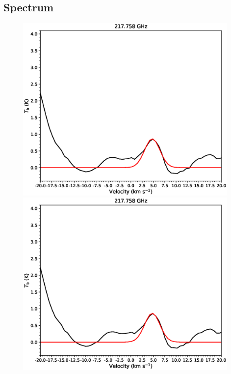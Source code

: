 \subsection{Spectrum}
\begin{figure}[H] 
\begin{center}
\begin{minipage}{0.98\textwidth} 
\begin{center}
\begin{minipage}{0.48\textwidth}
\begin{center}
\includegraphics[width=0.98\textwidth]{OrionKL/spectrum/HC/217.758328w_fit.eps}
\end{center}
\end{minipage}
\begin{minipage}{0.48\textwidth}
\begin{center}
\includegraphics[width=0.98\textwidth]{OrionKL/spectrum/HC/217.758328w_fit.eps}

\end{center}
\end{minipage}
\end{center}
\end{minipage}
\end{center}
\end{figure}
